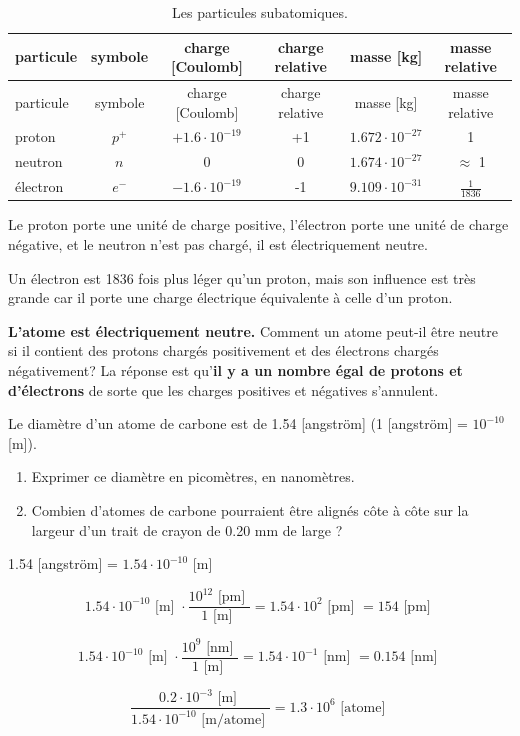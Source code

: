 \documentclass[
  11pt,
  french,
  a4paper,
  openany]{book}
\providecommand{\tightlist}{%
  \setlength{\itemsep}{0pt}\setlength{\parskip}{0pt}}
\begin{document}
\begin{longtable}[]{@{}lccccc@{}}
\caption{\label{tab:particules-subatomiques} Les particules subatomiques.}\tabularnewline
\toprule
particule & symbole & charge {[}Coulomb{]} & charge relative & masse {[}kg{]} & masse relative\tabularnewline
\midrule
\endfirsthead
\toprule
particule & symbole & charge {[}Coulomb{]} & charge relative & masse {[}kg{]} & masse relative\tabularnewline
\midrule
\endhead
proton & \(p^{+}\) & \(+1.6\cdot10^{-19}\) & +1 & \(1.672\cdot10^{-27}\) & 1\tabularnewline
neutron & \(n^{}\) & 0 & 0 & \(1.674\cdot10^{-27}\) & \(\approx\) 1\tabularnewline
électron & \(e^{-}\) & \(-1.6\cdot10^{-19}\) & -1 & \(9.109\cdot10^{-31}\) & \(\frac{1}{1836}\)\tabularnewline
\bottomrule
\end{longtable}

Le proton porte une unité de charge positive, l'électron porte une unité de charge négative, et le neutron n'est pas chargé, il est électriquement neutre.

Un électron est 1836 fois plus léger qu'un proton, mais son influence est très grande car il porte une charge électrique équivalente à celle d'un proton.

\textbf{L'atome est électriquement neutre.} Comment un atome peut-il être neutre si il contient des protons chargés positivement et des électrons chargés négativement? La réponse est qu'\textbf{il y a un nombre égal de protons et d'électrons} de sorte que les charges positives et négatives s'annulent.

\begin{Exercise}

Le diamètre d'un atome de carbone est de 1.54 {[}angström{]} (1 {[}angström{]} = \(10^{-10}\) {[}m{]}).

\begin{enumerate}
\def\labelenumi{\arabic{enumi}.}
\tightlist
\item
  Exprimer ce diamètre en picomètres, en nanomètres.
\item
  Combien d'atomes de carbone pourraient être alignés côte à côte sur la largeur d'un trait de crayon de 0.20 mm de large ?
\end{enumerate}


\end{Exercise}

\begin{Answer}
1.54 {[}angström{]} = \(1.54\cdot10^{-10}\) {[}m{]}

\[ 1.54\cdot10^{-10} \text{ [m] } \cdot \frac{ 10^{12}\text{ [pm] }}{1\text{ [m] }} = 1.54\cdot10^{2} \text{ [pm] } = 154 \text{ [pm] } \]

\[ 1.54\cdot10^{-10} \text{ [m] } \cdot \frac{ 10^{9}\text{ [nm] }}{1\text{ [m] }} = 1.54\cdot10^{-1} \text{ [nm] } = 0.154 \text{ [nm] } \]

\[ \frac{0.2\cdot10^{-3} \text{ [m] }}{1.54\cdot10^{-10} \text{ [m/atome] }} = 1.3\cdot10^6 \text{ [atome] } \]

\end{Answer}
\end{document}
